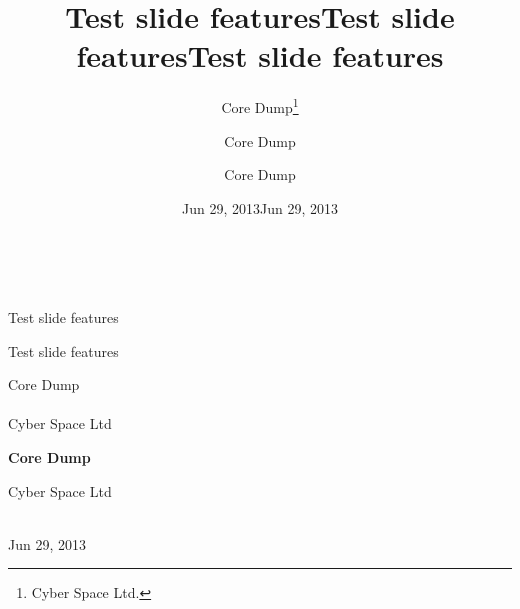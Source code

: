\documentclass[%
oneside,                 %
final,                   %
chapterprefix=true,      %
open=right               %
10pt]{book}
\begin{document}







\title{Test slide features}


\thispagestyle{empty}
\hbox{\ \ }
\vfill
\begin{center}
{\huge{\bfseries{
\begin{spacing}{1.25}
Test slide features
\end{spacing}
}}}

\title*{Test slide features}

\title{Test slide features}
\begin{center}
{\LARGE\bf
\begin{spacing}{1.25}
Test slide features
\end{spacing}
}
\end{center}

\author{Core Dump\footnote{Cyber Space Ltd.}}

\vspace{1.3cm}

{\Large\textsf{Core Dump}}\\ [3mm]

\ \\ [2mm]

{\large\textsf{Cyber Space Ltd} \\ [1.5mm]}

\author{Core Dump}

\author{Core Dump}

\begin{center}
{\bf Core Dump}
\end{center}

\begin{center}
\centerline{{\small Cyber Space Ltd}}
\end{center}


\date{Jun 29, 2013}
\maketitle
\date{Jun 29, 2013
}

\ \\ [10mm]
{\large\textsf{Jun 29, 2013}}

\end{center}
\end{document}

